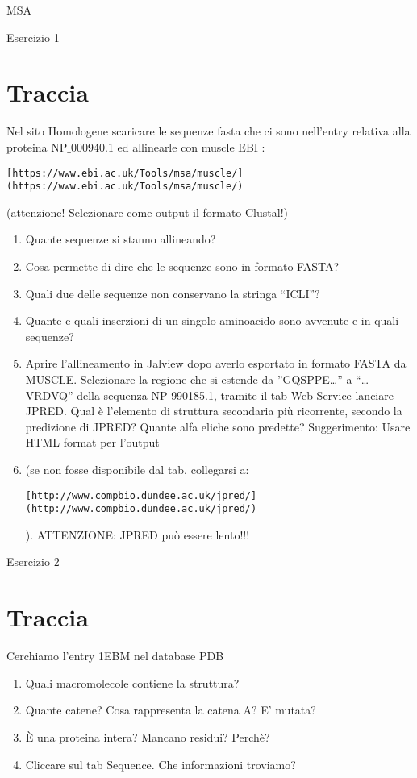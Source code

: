 \documentclass{article}
\begin{document}
\begin{center}
   \Huge
   MSA
\end{center}
\begin{center}
   \huge
   Esercizio 1
\end{center}
\section*{Traccia}
Nel sito Homologene scaricare le sequenze fasta che ci sono nell’entry relativa alla proteina NP$\_$000940.1 ed allinearle con muscle EBI : \begin{verbatim}[https://www.ebi.ac.uk/Tools/msa/muscle/](https://www.ebi.ac.uk/Tools/msa/muscle/)\end{verbatim} (attenzione! Selezionare come output il formato Clustal!)
\begin{enumerate}
   \item Quante sequenze si stanno allineando?
   \item Cosa permette di dire che le sequenze sono in formato FASTA?
   \item Quali due delle sequenze non conservano la stringa “ICLI”?
   \item Quante e quali inserzioni di un singolo aminoacido sono avvenute e in quali sequenze?
   \item Aprire l’allineamento in Jalview dopo averlo esportato in formato FASTA da MUSCLE. Selezionare la regione che si estende da ”GQSPPE…” a “… VRDVQ” della sequenza NP$\_$990185.1, tramite il tab Web Service lanciare JPRED. Qual è l’elemento di struttura secondaria più ricorrente, secondo la predizione di JPRED? Quante alfa eliche sono predette? Suggerimento: Usare HTML format per l’output
   \item (se non fosse disponibile dal tab, collegarsi a: \begin{verbatim}[http://www.compbio.dundee.ac.uk/jpred/](http://www.compbio.dundee.ac.uk/jpred/)\end{verbatim} ). ATTENZIONE: JPRED può essere lento!!!
\end{enumerate}

\begin{center}
   \huge
   Esercizio 2
\end{center}
\section*{Traccia}
Cerchiamo l’entry 1EBM nel database PDB
\begin{enumerate}
   \item Quali macromolecole contiene la struttura?
   \item Quante catene? Cosa rappresenta la catena A? E’ mutata?
   \item È una proteina intera? Mancano residui? Perchè?
   \item Cliccare sul tab Sequence. Che informazioni troviamo?
\end{enumerate}
\end{document}
